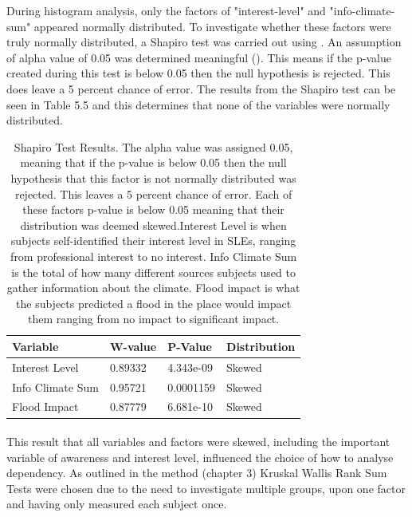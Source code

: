 During histogram analysis, only the factors of "interest-level" and "info-climate-sum" appeared normally distributed. To investigate whether these factors were truly normally distributed, a Shapiro test was carried out using \cite{royston_extension_1982}.  An assumption of alpha value of 0.05 was determined meaningful (\cite{royston_extension_1982}). This means if the p-value created during this test is below 0.05 then the null hypothesis is rejected. This does leave a 5 percent chance of error. The results from the Shapiro test can be seen in Table 5.5 and this determines that none of the variables were normally distributed. 

\begin{table}[H]
    \centering
    \begin{tabular}{|l|l|l|l|}
    \hline
         \textbf{ Variable } &  \textbf{W-value}& \textbf{ P-Value}& \textbf{Distribution}\\ \hline
       Interest Level & 0.89332 & 4.343e-09 & Skewed \\ \hline
         Info Climate Sum  & 0.95721 & 0.0001159 & Skewed \\ \hline
        Flood Impact & 0.87779 & 6.681e-10 & Skewed \\ \hline
     \end{tabular}
    \caption{Shapiro Test Results. The alpha value was assigned 0.05, meaning that if the p-value is below 0.05 then the null hypothesis that this factor is not normally distributed was rejected. This leaves a 5 percent chance of error. Each of these factors p-value is below 0.05 meaning that their distribution was deemed skewed.Interest Level is when subjects self-identified their interest level in SLEs, ranging from professional interest to no interest. Info Climate Sum is the total of how many different sources subjects used to gather information about the climate. Flood impact is what the subjects predicted a flood in the place would impact them ranging from no impact to significant impact. }
    \label{table:shapiro_test_results}
\end{table}
\paragraph{}

This result that all variables and factors were skewed, including the important variable of awareness and interest level, influenced the choice of how to analyse dependency. As outlined in the method (chapter 3) Kruskal Wallis Rank Sum Tests were chosen due to the need to investigate multiple groups, upon one factor and having only measured each subject once.

